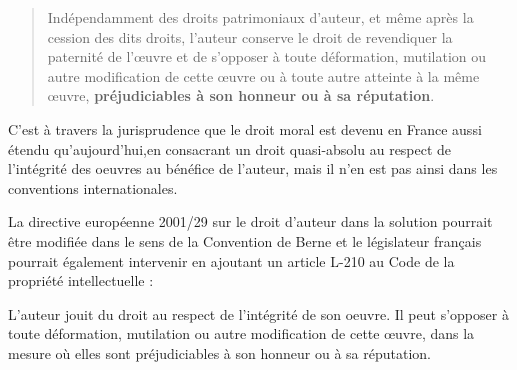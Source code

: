 \begin{quotation}
Indépendamment des droits patrimoniaux d’auteur, et même après la cession des dits droits, l’auteur conserve le droit de revendiquer la paternité de l’œuvre et de s’opposer à toute déformation, mutilation ou autre modification de cette œuvre ou à toute autre atteinte à la même œuvre, \textbf{préjudiciables à son honneur ou à sa réputation}.
\end{quotation}

C’est à travers la jurisprudence que le droit moral est devenu en France aussi étendu qu’aujourd’hui,en consacrant un droit quasi-absolu au respect de l'intégrité des oeuvres au bénéfice de l'auteur, mais il n'en est pas ainsi dans les conventions internationales.

La directive européenne 2001/29 sur le droit d'auteur dans la solution pourrait être modifiée dans le sens de la Convention de Berne et le législateur français pourrait également intervenir en ajoutant un article L-210 au Code de la propriété intellectuelle :

\begin{mesure}
L’auteur jouit du droit au respect de l’intégrité de son oeuvre. Il peut s’opposer à toute déformation, mutilation ou autre modification de cette œuvre, dans la mesure où elles sont préjudiciables à son honneur ou à sa réputation.
\end{mesure}

